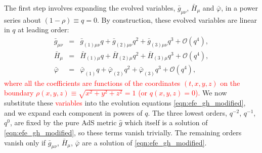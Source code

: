 \documentclass[a4paper,11pt]{article}
\numberwithin{equation}{section}
\begin{document}
The first step involves expanding the evolved variables, $\bar{g}_{\mu \nu}$, $\bar{H}_{\mu}$ and $\bar{\varphi}$, in a power series about $(1-\rho) \equiv q = 0$. 
By construction, these evolved variables are linear in $q$ at leading order:
\begin{eqnarray}\label{eqn:qexp}
\bar{g}_{\mu \nu} &=& \bar{g}_{(1) \mu \nu} q + \bar{g}_{(2) \mu \nu} q^2 + \bar{g}_{(3) \mu \nu} q^3 + \mathcal{O}(q^4), \label{eqn:qexpg} \\
\bar{H}_{\mu} &=& \bar{H}_{(1) \mu} q + \bar{H}_{(2) \mu} q^2 + \bar{H}_{(3) \mu} q^3 + \mathcal{O}(q^4)  ,\label{eqn:qexpH}\\
\bar{\varphi} &=& \bar{\varphi}_{(1)} q + \bar{\varphi}_{(2)} q^2 + \bar{\varphi}_{(3)} q^3 + \mathcal{O}(q^4), \label{eqn:qexpphi}
\end{eqnarray}
\textcolor{red}{where all the coefficients are functions of the coordinates $(t,x,y,z)$ on the boundary $\rho(x,y,z)\equiv\sqrt{x^2+y^2+z^2}=1$ (or $q(x,y,z)=0$).}
We now substitute these \textcolor{red}{variables} into the evolution equations \eqref{eqn:efe_gh_modified}, and we expand each component in powers of $q$. The three lowest orders, $q^{-2}$, $q^{-1}$, $q^0$, are fixed by the pure AdS metric $\hat{g}$ which itself is a solution of \eqref{eqn:efe_gh_modified}, so these terms vanish trivially. The remaining orders vanish only if $\bar{g}_{\mu \nu}$, $\bar{H}_{\mu}$, $\bar{\varphi}$ are a solution of \eqref{eqn:efe_gh_modified}.
\end{document}
